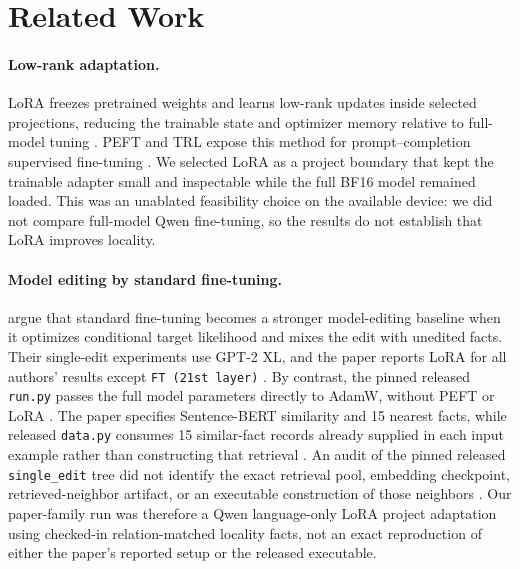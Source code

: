 \section{Related Work}

\paragraph{Low-rank adaptation.}
LoRA freezes pretrained weights and learns low-rank updates inside selected
projections, reducing the trainable state and optimizer memory relative to
full-model tuning \citep{hu2021lora}. PEFT and TRL expose this method for
prompt--completion supervised fine-tuning \citep{peftlora,trlpeft,trlsft}.
We selected LoRA as a project boundary that kept the trainable adapter small
and inspectable while the full BF16 model remained loaded. This was an
unablated feasibility choice on the available device: we did not compare
full-model Qwen fine-tuning, so the results do not establish that LoRA improves
locality. 

\paragraph{Model editing by standard fine-tuning.}
\citet{gangadhar2024model} argue that standard fine-tuning becomes a stronger
model-editing baseline when it optimizes conditional target likelihood and
mixes the edit with unedited facts. Their single-edit experiments use GPT-2 XL,
and the paper reports LoRA for all authors' results except
\texttt{FT (21st layer)} \citep{gangadhar2024model}. By contrast, the pinned
released \texttt{run.py} passes the full model parameters directly to AdamW,
without PEFT or LoRA \citep{gangadhar2024launcher,gangadhar2024run}. The paper
specifies Sentence-BERT similarity and 15 nearest facts, while released
\texttt{data.py} consumes 15 similar-fact records already supplied in each
input example rather than constructing that retrieval
\citep{gangadhar2024model,gangadhar2024data}. An audit of the pinned released
\texttt{single\_edit} tree did not identify the exact retrieval pool,
embedding checkpoint, retrieved-neighbor artifact, or an executable
construction of those neighbors \citep{gangadhar2024code}. Our paper-family
run was therefore a Qwen language-only LoRA project adaptation using checked-in
relation-matched locality facts, not an exact reproduction of either the
paper's reported setup or the released executable.


